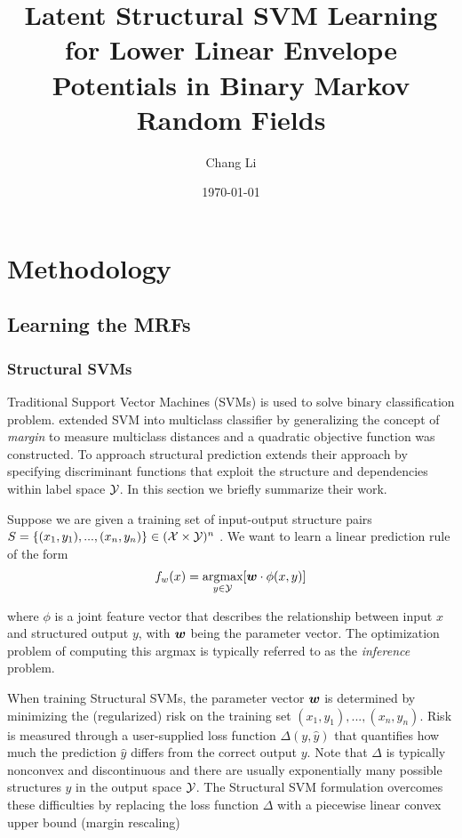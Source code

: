 \documentclass[twoside,doublespace,onecolumn,11pt,a4paper]{book}
\title{Latent Structural SVM Learning for Lower Linear
  Envelope Potentials in Binary Markov Random Fields}
\author{Chang Li} \date{\today}
\renewcommand{\citename}{\citet}
\renewcommand{\cite}{\citep}
\begin{document}

\chapter{Methodology}
\label{cha:methodology}

\section{Learning the MRFs}
\label{sec:learning}

\subsection{Structural SVMs}
\label{sec:ssvm}

Traditional Support Vector Machines (SVMs) is used to solve
binary classification problem. \citename{crammer2002algorithmic}
extended SVM into multiclass classifier by generalizing the
concept of \emph{margin} to measure multiclass distances and a
quadratic objective function was constructed. To approach
structural prediction \citename{tsochantaridis2005large} extends
their approach by specifying discriminant functions that exploit
the structure and dependencies within label space ${\cal Y}$. In this
section we briefly summarize their work.

Suppose we are given a training set of input-output structure
pairs $S=\{(x_1,y_1),...,(x_n,y_n)\}\in({\cal X}\times {\cal Y})^n$ . We want
to learn a linear prediction rule of the form
\begin{align}
  \label{eq:ssvm}
  f_w(x)=\mathop{\textrm{argmax}}_{ y\in {\cal Y} } [{\boldsymbol{w}}\cdot\phi(x,y)]
\end{align}


where $\phi$ is a joint feature vector that describes the
relationship between input $x$ and structured output $y$, with
${\boldsymbol{w}}$ being the parameter vector. The optimization problem of
computing this argmax is typically referred to as the \emph{
  inference } problem.

When training Structural SVMs, the parameter vector ${\boldsymbol{w}}$ is
determined by minimizing the (regularized) risk on the training
set $(x_1,y_1),...,(x_n,y_n)$. Risk is measured through a
user-supplied loss function $\Delta(y,\hat{ y })$ that quantifies
how much the prediction $\hat{y}$ differs from the correct output
$y$. Note that $\Delta$ is typically nonconvex and discontinuous
and there are usually exponentially many possible structures
$\hat{y}$ in the output space ${\cal Y}$. The Structural SVM
formulation\cite{tsochantaridis2005large} overcomes these
difficulties by replacing the loss function $\Delta$ with a
piecewise linear convex upper bound (margin rescaling)
\end{document}
